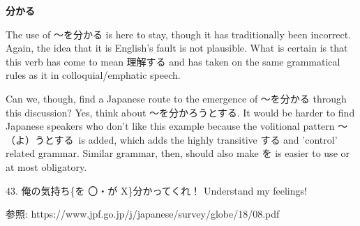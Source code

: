 \par{ \textbf{分かる }}

\par{ The use of ～を分かる is here to stay, though it has traditionally been incorrect. Again, the idea that it is English's fault is not plausible. What is certain is that this verb has come to mean 理解する and has taken on the same grammatical rules as it in colloquial\slash emphatic speech. }

\par{ Can we, though, find a Japanese route to the emergence of ～を分かる through this discussion? Yes, think about ～を分かろうとする. It would be harder to find Japanese speakers who don't like this example because the volitional pattern ～（よ）うとする is added, which adds the highly transitive する and 'control' related grammar. Similar grammar, then, should also make を is easier to use or at most obligatory. }

\par{43. 俺の気持ち\{を 〇・が X\}分かってくれ！ \hfill\break
Understand my feelings! }

\par{参照: https:\slash \slash www.jpf.go.jp\slash j\slash japanese\slash survey\slash globe\slash 18\slash 08.pdf }
    